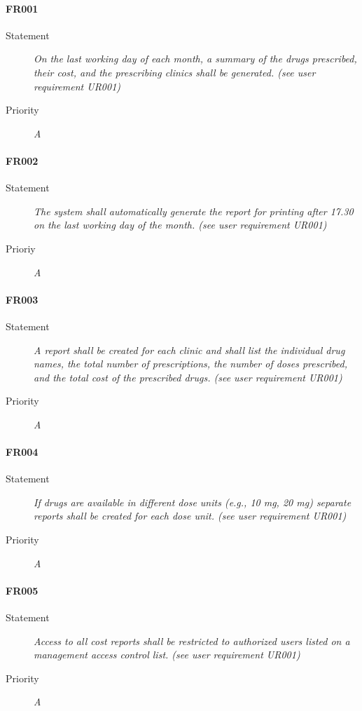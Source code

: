 \paragraph{FR001}
\begin{description}
  \item [Statement] 
    \textit{On the last working day of each month, a summary of the drugs
    prescribed, their cost, and the prescribing clinics shall be
    generated. (see user requirement UR001)}
  \item [Priority] \textit{A}
\end{description}

\paragraph{FR002}
\begin{description}
  \item [Statement]
    \textit{The system shall automatically generate the report for printing
    after 17.30 on the last working day of the month.
    (see user requirement UR001)}
  \item [Prioriy] \textit{A}
\end{description}

\paragraph{FR003}
\begin{description}
  \item [Statement] 
    \textit{A report shall be created for each clinic and shall list the
    individual drug names, the total number of prescriptions, the number of
    doses prescribed, and the total cost of the prescribed drugs. 
    (see user requirement UR001)}
  \item [Priority] \textit{A}
\end{description}

\paragraph{FR004}
\begin{description}
  \item [Statement] 
    \textit{If drugs are available in different dose units (e.g., 10 mg, 20 mg)
    separate reports shall be created for each dose unit. 
    (see user requirement UR001)}
  \item [Priority] \textit{A}
\end{description}

\paragraph{FR005}
\begin{description}
  \item [Statement] 
    \textit{Access to all cost reports shall be restricted to authorized users
    listed on a management access control list. 
    (see user requirement UR001)}
  \item [Priority] \textit{A}
\end{description}

